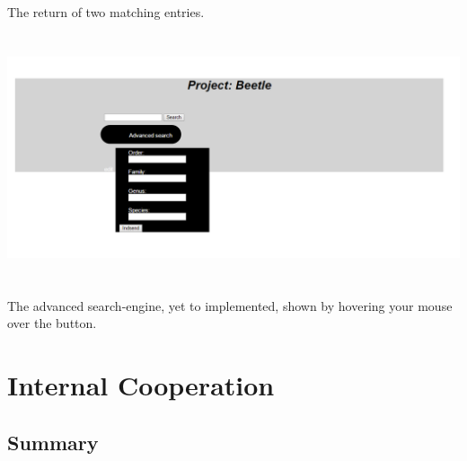 \documentclass[12pt,a4paper]{article}
\begin{document}
The return of two matching entries.\\
\includegraphics[height=80mm]{Prototype5.png}\\
The advanced search-engine, yet to implemented, shown by hovering your mouse over the button.\\

\newpage

\section{Internal Cooperation}
\subsection{Summary}
\end{document}
